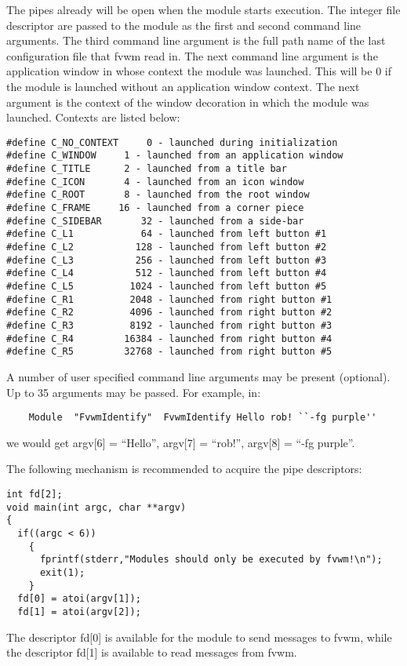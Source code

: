 The pipes already will be open when the module starts execution. The
integer file descriptor are passed to the module as the first and
second command line arguments. The third command line argument is the
full path name of the last configuration file that fvwm read in.
The next command line argument is the application
window in whose context the module was launched. This will be 0 if the
module is launched without an application window context. The next
argument is the context of the window decoration in which the module
was launched. Contexts are listed below:
\begin{verbatim}
#define C_NO_CONTEXT 	 0 - launched during initialization
#define C_WINDOW	 1 - launched from an application window
#define C_TITLE		 2 - launched from a title bar
#define C_ICON		 4 - launched from an icon window
#define C_ROOT		 8 - launched from the root window
#define C_FRAME		16 - launched from a corner piece
#define C_SIDEBAR       32 - launched from a side-bar
#define C_L1            64 - launched from left button #1
#define C_L2           128 - launched from left button #2
#define C_L3           256 - launched from left button #3
#define C_L4           512 - launched from left button #4
#define C_L5          1024 - launched from left button #5
#define C_R1          2048 - launched from right button #1
#define C_R2          4096 - launched from right button #2
#define C_R3          8192 - launched from right button #3
#define C_R4         16384 - launched from right button #4
#define C_R5         32768 - launched from right button #5
\end{verbatim}
A number of user specified command line arguments may be present
(optional). Up to 35 arguments may be passed. For example, in:
\begin{verbatim}
	Module	"FvwmIdentify"	FvwmIdentify Hello rob! ``-fg purple''
\end{verbatim}
we would get argv[6] = ``Hello'', argv[7] = ``rob!'', argv[8] = ``-fg purple''.

The following mechanism is recommended to acquire the pipe
descriptors:
\begin{verbatim}
int fd[2];
void main(int argc, char **argv)
{
  if((argc < 6))
    {	
      fprintf(stderr,"Modules should only be executed by fvwm!\n");
      exit(1);
    }
  fd[0] = atoi(argv[1]);
  fd[1] = atoi(argv[2]);

\end{verbatim}

The descriptor fd[0] is available for the module to send messages to
fvwm, while the descriptor fd[1] is available to read messages from
fvwm.

